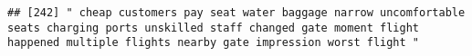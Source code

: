 \documentclass[
]{article}
\begin{document}
\begin{verbatim}
## [242] " cheap customers pay seat water baggage narrow uncomfortable seats charging ports unskilled staff changed gate moment flight happened multiple flights nearby gate impression worst flight "                                                                                                                                                                                                                                                                                                                                                                                                                                                                                                                                                                                                                                                                                                                                                                                                                                                                                                                                                                                                                                                                                                                                                                                                                                                                                                                                                                                                                                                                                                                                                                                                   

\end{verbatim}
\end{document}
